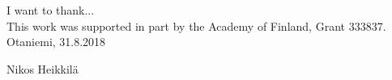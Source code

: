 I want to thank...\\
This work was supported in part by the Academy of Finland, Grant 333837.
\vspace{5cm}
Otaniemi, 31.8.2018

\vspace{5mm}
{\hfill Nikos Heikkilä \hspace{1cm}}
